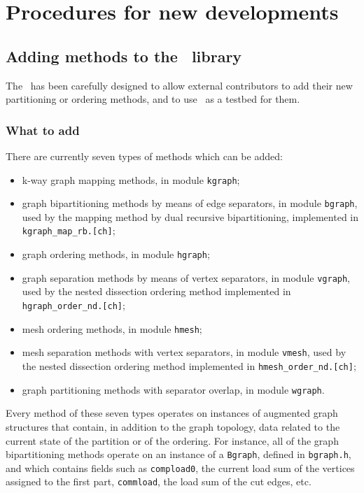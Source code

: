 
\section{Procedures for new developments}

\subsection{Adding methods to the \libscotch\ library}
\label{sec-method}

The \libscotch\ has been carefully designed to allow external
contributors to add their new partitioning or ordering methods, and
to use \scotch\ as a testbed for them.

\subsubsection{What to add}

There are currently seven types of methods which can be added:
\begin{itemize}
\item
k-way graph mapping methods, in module \texttt{kgraph};
\item
graph bipartitioning methods by means of edge separators, in module
\texttt{bgraph}, used by the mapping method by dual recursive
bipartitioning, implemented in \texttt{kgraph\_\lbt map\_\lbt rb.[ch]};
\item
graph ordering methods, in module \texttt{hgraph};
\item
graph separation methods by means of vertex separators, in module
\texttt{vgraph}, used by the nested dissection ordering method
implemented in \texttt{hgraph\_\lbt order\_\lbt nd.[ch]};
\item
mesh ordering methods, in module \texttt{hmesh};
\item
mesh separation methods with vertex separators, in module
\texttt{vmesh}, used by the nested dissection ordering method
implemented in \texttt{hmesh\_\lbt order\_\lbt nd.[ch]};
\item
graph partitioning methods with separator overlap, in module
\texttt{wgraph}.
\end{itemize}
Every method of these seven types operates on instances of augmented
graph structures that contain, in addition to the graph topology,
data related to the current state of the partition or of the
ordering. For instance, all of the graph bipartitioning methods
operate on an instance of a \texttt{Bgraph}, defined in \texttt{bgraph.h},
and which contains fields such as \texttt{compload0}, the current load
sum of the vertices assigned to the first part, \texttt{commload}, the
load sum of the cut edges, etc.

